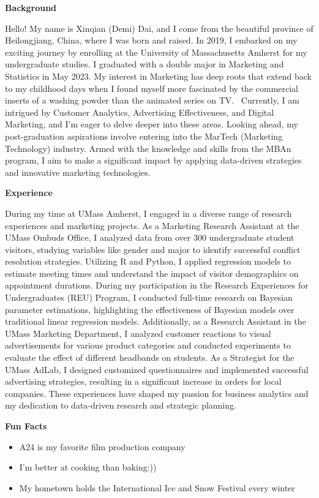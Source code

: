 \documentclass[
]{book}
\begin{document}
\textbf{Background}

Hello! My name is Xinqian (Demi) Dai, and I come from the beautiful province of Heilongjiang, China, where I was born and raised. In 2019, I embarked on my exciting journey by enrolling at the University of Massachusetts Amherst for my undergraduate studies. I graduated with a double major in Marketing and Statistics in May 2023. My interest in Marketing has deep roots that extend back to my childhood days when I found myself more fascinated by the commercial inserts of a washing powder than the animated series on TV.~ Currently, I am intrigued by Customer Analytics, Advertising Effectiveness, and Digital Marketing, and I'm eager to delve deeper into these areas. Looking ahead, my post-graduation aspirations involve entering into the MarTech (Marketing Technology) industry. Armed with the knowledge and skills from the MBAn program, I aim to make a significant impact by applying data-driven strategies and innovative marketing technologies.

\textbf{Experience}

During my time at UMass Amherst, I engaged in a diverse range of research experiences and marketing projects. As a Marketing Research Assistant at the UMass Ombuds Office, I analyzed data from over 300 undergraduate student visitors, studying variables like gender and major to identify successful conflict resolution strategies. Utilizing R and Python, I applied regression models to estimate meeting times and understand the impact of visitor demographics on appointment durations. During my participation in the Research Experiences for Undergraduates (REU) Program, I conducted full-time research on Bayesian parameter estimations, highlighting the effectiveness of Bayesian models over traditional linear regression models. Additionally, as a Research Assistant in the UMass Marketing Department, I analyzed customer reactions to visual advertisements for various product categories and conducted experiments to evaluate the effect of different headbands on students. As a Strategist for the UMass AdLab, I designed customized questionnaires and implemented successful advertising strategies, resulting in a significant increase in orders for local companies. These experiences have shaped my passion for business analytics and my dedication to data-driven research and strategic planning.

\textbf{Fun Facts}

\begin{itemize}
\item
  A24 is my favorite film production company
\item
  I'm better at cooking than baking:))
\item
  My hometown holds the International Ice and Snow Festival every winter
\end{itemize}
\end{document}

